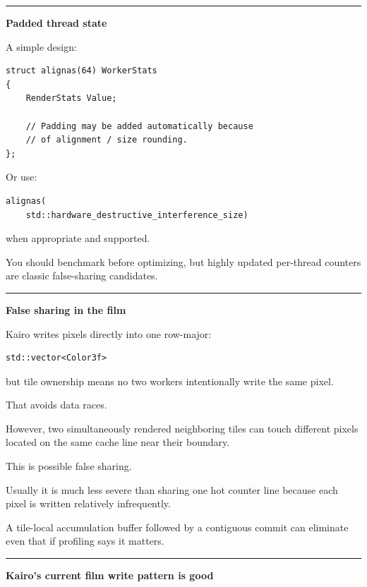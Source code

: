 \begin{center}\rule{0.5\linewidth}{0.5pt}\end{center}

\textbf{Padded thread state}

A simple design:

\begin{verbatim}
struct alignas(64) WorkerStats
{
    RenderStats Value;

    // Padding may be added automatically because
    // of alignment / size rounding.
};
\end{verbatim}

Or use:

\begin{verbatim}
alignas(
    std::hardware_destructive_interference_size)
\end{verbatim}

when appropriate and supported.

You should benchmark before optimizing, but highly updated per-thread counters are classic false-sharing candidates.

\begin{center}\rule{0.5\linewidth}{0.5pt}\end{center}

\textbf{False sharing in the film}

Kairo writes pixels directly into one row-major:

\begin{verbatim}
std::vector<Color3f>
\end{verbatim}

but tile ownership means no two workers intentionally write the same pixel.

That avoids data races.

However, two simultaneously rendered neighboring tiles can touch different pixels located on the same cache line near their boundary.

This is possible false sharing.

Usually it is much less severe than sharing one hot counter line because each pixel is written relatively infrequently.

A tile-local accumulation buffer followed by a contiguous commit can eliminate even that if profiling says it matters.

\begin{center}\rule{0.5\linewidth}{0.5pt}\end{center}

\textbf{Kairo's current film write pattern is good}


